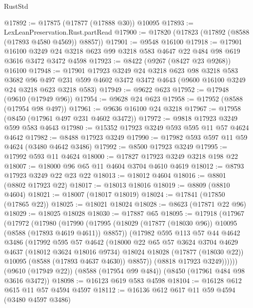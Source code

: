 \begin{lexlean}{RustStd}
\begin{coremodule}
@17892 := @17875 (@17877 (@17888 @30)) @10095
@17893 := LexLeanPreservation.Rust.partRead
@17900 := @17820 (@17823 (@17892 (@8588 (@17893 @4580 @4569)) @8857))
@17901 := @9548 @16100
@17918 := @17901
    @16100
    @3249
    @24
    @3218
    @623
    @99
    @3218
    @583
    @4647
    @22
    @484
    @98
    @619
    @3616
    @3472
    @3472
    @4598
@17923 := @8422 (@9267 (@8427 @23 @9268)) @16100
@17948 := @17901
    @17923
    @3249
    @24
    @3218
    @623
    @98
    @3218
    @583
    @3682
    @96
    @497
    @231
    @599
    @4602
    @3472
    @3472
    @4643
    (@9600 @16100 @3249 @24 @3218 @623 @3218 @583)
@17949 := @9622 @623
@17952 := @17948 (@9610 (@17949 @96))
@17954 := @9628 @24 @623
@17958 := @17952 (@8588 (@17954 @98 @497))
@17961 := @9636 @16100 @24 @3218
@17967 := @17958 (@8450 (@17961 @497 @231 @4602 @3472))
@17972 := @9818 @17923 @3249 @599 @583 @4643
@17980 := @15352 @17923 @3249 @593 @595 @11 @57 @4624 @4642
@17982 := @8488 @17923 @3249
@17990 := @17982 @593 @597 @11 @59 @4624 (@3480 @4642 @3486)
@17992 := @8500 @17923 @3249
@17995 := @17992 @593 @11 @4624
@18000 := @17827 @17923 @3249 @3218 @198 @22
@18007 := @18000 @96 @65 @11 @4604 @3704 @4610 @4619
@18012 := @8793 @17923 @3249 @22 @23 @22
@18013 := @18012 @4604
@18016 := @8801 (@8802 @17923 @22)
@18017 := @18013 @18016
@18019 := @8809 (@8810 @4604)
@18021 := @18007 (@18017 @18019)
@18024 := @17841 (@17850 (@17865 @22))
@18025 := @18021 @18024
@18028 := @8623 (@17871 @22 @96)
@18029 := @18025 @18028
@18030 := @17887 @65
@18095 := @17918
    (@17967
      (@17972
        (@17980
          (@17990
            (@17995 (@18029 (@17877 (@18030 @96)) @10095 (@8588 (@17893 @4619 @4611)) @8857))
            (@17982
              @595
              @113
              @57
              @44
              @4642
              @3486
              (@17992
                @595
                @57
                @4642
                (@18000
                  @22
                  @65
                  @57
                  @3624
                  @3704
                  @4629
                  @4637
                  (@18012 @3624 @18016 @9734)
                  @18024
                  @18028
                  (@17877 (@18030 @22))
                  @10095
                  (@8588 (@17893 @4637 @4630))
                  @8857))
              (@8818 @17923 @3249))))))
    (@9610 (@17949 @22))
    (@8588 (@17954 @99 @484))
    (@8450 (@17961 @484 @98 @3616 @3472))
@18098 := @16123 @619 @583 @4598
@18104 := @16128 @612 @615 @11 @57 @4594 @4597
@18112 := @16136 @612 @617 @11 @59 @4594 (@3480 @4597 @3486)

\end{coremodule}
\end{lexlean}
